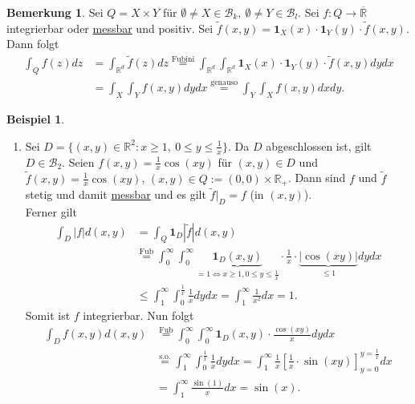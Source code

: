 \documentclass[a4paper]{report}
\newcommand{\doubleOne}{\textbf{1}}
\newcommand{\R}{\mathbb{R}}
\newcommand{\Rq}{\overline{\R}}
\newcommand{\Borel}{\mathcal{B}}
\newcommand{\jlabel}[1]{\label{j_#1}}
\newcommand{\jshortlink}[1]{\jhyperref{#1}{\text{#1}}}
\newcommand{\jhyperref}[2]{\hyperref[j_#1]{#2}}
\newcommand{\jlink}[1]{\jhyperref{#1}{#1}}
\newcommand{\jabb}[3]{ #1: #2 \rightarrow #3 }
\newcommand{\jshortlinkFubini}{\jhyperref{Fubini}{\text{Fub}}}
\theoremstyle{plain}
\theoremstyle{definition}
\newtheorem{bem}[thm]{Bemerkung}
\newtheorem*{expl*}{Beispiel}
\begin{document}
{{{{\begin{bem}
\jlabel{Bem 3.29}
    Sei $Q=X\times Y$ für $\emptyset \ne X \in \Borel_k, \ \emptyset \ne Y \in \Borel_l$. Sei $\jabb{f}{Q}{\Rq}$ integrierbar oder \jlink{messbar} und positiv. Sei $\tilde{f}(x,y) = \doubleOne_X(x)\cdot \doubleOne_Y(y)\cdot \tilde{f}(x,y)$. Dann folgt
    \begin{displaymath}
        \begin{split}
            \int_Q f(z)dz &= \int_{\R^d} \tilde{f}(z)dz \overset{\jshortlink{Fubini}}{=} \int_{\R^d} \int_{\R^d} \doubleOne_X(x)\cdot \doubleOne_Y(y) \cdot \tilde{f}(x,y)dydx\\
            & = \int_X\int_Y f(x,y)dydx \overset{\text{genauso}}{=} \int_Y\int_X f(x,y)dxdy.
        \end{split}
    \end{displaymath}
\end{bem}


\begin{expl*}
    \begin{enumerate}
        \item 
            Sei $D = \{(x,y) \in \R^2 : x \ge 1, \ 0\le y \le \frac{1}{x}\}$. Da $D$ abgeschlossen ist, gilt $D\in \Borel_2$. Seien $f(x,y) = \frac{1}{x}\cos(xy)$ für $(x,y) \in D$ und $\tilde{f}(x,y) = \frac{1}{x}\cos(xy)$, $(x,y)\in Q := (0,0)\times \R_+$. Dann sind $f$ und $\tilde{f}$ stetig und damit \jlink{messbar} und es gilt $\tilde{f}|_D = f$ (in $(x,y)$).\\
            Ferner gilt
            \begin{displaymath}
                \begin{split}
                    \int_D |f|d(x,y) &= \int_Q \doubleOne_D |\tilde{f}|d(x,y)\\
                    &\overset{\jshortlinkFubini}{=} \int_0^\infty \int_0^\infty \underbrace{\doubleOne_D(x,y)}_{= 1 \Leftrightarrow x\ge 1, 0 \le y \le \frac{1}{x}}\cdot \frac{1}{x} \cdot \underbrace{|\cos(xy)|}_{\le 1} dydx\\
                    &\le \int_1^\infty \int_0^{\frac{1}{x}} \frac{1}{x}dydx = \int_1^\infty \frac{1}{x^2} dx = 1.
                \end{split}
            \end{displaymath}
            Somit ist $f$ integrierbar. Nun folgt
            \begin{displaymath}
                \begin{split}
                    \int_D f(x,y) d(x,y) &\overset{\jshortlinkFubini}{=} \int_0^\infty \int_0^\infty \doubleOne_D(x,y) \cdot \frac{\cos(xy)}{x} dydx\\
                    &\overset{\text{s.o.}}{=} \int_1^\infty \int_0^\frac{1}{x} \frac{1}{x}dydx = \int_1^\infty \frac{1}{x} \left[\frac{1}{x} \cdot \sin(xy) \right]_{y=0}^{y=\frac{1}{x}} dx\\
                    &= \int_1^\infty \frac{\sin(1)}{x} dx = \sin(x).
                \end{split}
            \end{displaymath}


\end{enumerate}
\end{expl*}}}}}
\end{document}
